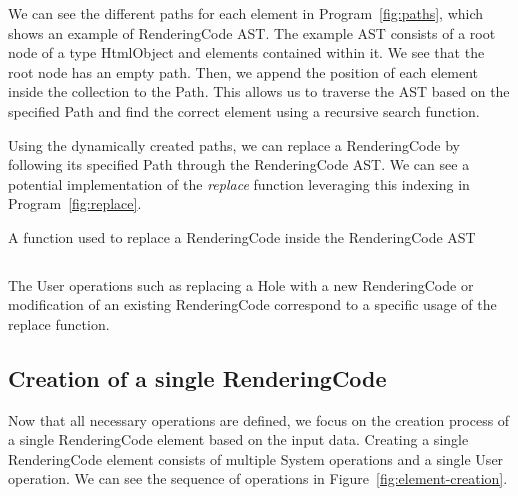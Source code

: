 We can see the different paths for each element in Program~\ref{fig:paths}, which shows an example of RenderingCode AST.
The example AST consists of a root node of a type HtmlObject and elements contained within it.
We see that the root node has an empty path.
Then, we append the position of each element inside the collection to the Path.
This allows us to traverse the AST based on the specified Path and find the correct element using a recursive search function.


Using the dynamically created paths, we can replace a RenderingCode by following its specified Path through the RenderingCode AST.
We can see a potential implementation of the \emph{replace} function leveraging this indexing in Program~\ref{fig:replace}.


\begin{listing}
	\caption {A function used to replace a RenderingCode inside the RenderingCode AST}
	\label{fig:replace}
	\begin{lstlisting}
  \end{lstlisting}
\end{listing}

The User operations such as replacing a Hole with a new RenderingCode or modification of an existing RenderingCode correspond to a specific usage of the replace function.

\subsection{Creation of a single RenderingCode}

Now that all necessary operations are defined, we focus on the creation process of a single RenderingCode element based on the input data.
Creating a single RenderingCode element consists of multiple System operations and a single User operation.
We can see the sequence of operations in Figure~\ref{fig:element-creation}.

